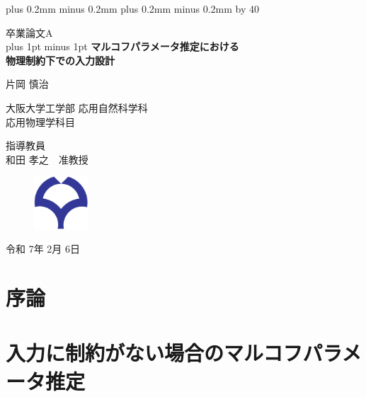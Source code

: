 \documentclass[a4paper,12pt,oneside,openany]{jsbook}
\def\kcharparline#1{%
   \ifx\xkanjiskip\undefined%
   \jintercharskip 0mm plus 0.2mm minus 0.2mm
   \else
   \xkanjiskip 0mm plus 0.2mm minus 0.2mm
   \fi
   \settowidth{\textwidth}{あ}%
   \multiply\textwidth by #1}
\begin{document}
\kcharparline{40} %



\begin{titlepage}
\begin{center}
	{\Large 卒業論文A\\}
	\vspace{ 5mm }
	\baselineskip 35pt plus 1pt minus 1pt
	{\bf {\huge マルコフパラメータ推定における \\物理制約下での入力設計}}
	
	\vspace{ 30mm }
	{\LARGE 片岡 慎治 \\}
	
	\vspace{ 10mm }
	{\large 大阪大学工学部 応用自然科学科\\}
	{\large 応用物理学科目\\}
	
	\vspace{ 10mm }
	{\large 指導教員\\}
	{\large 和田 孝之　准教授 \\}
	
	\vspace{ 5mm }
	\begin{figure}[h]
	\centering
	\includegraphics[width=20mm]{osaka_logo.pdf}\\
	\end{figure}
	\vspace{ 5mm }
	{\large 令和 7年 2月 6日}
\end{center}
\end{titlepage}
\thispagestyle{empty}


\frontmatter

\tableofcontents

\mainmatter
% 
\chapter{序論}



\chapter{入力に制約がない場合のマルコフパラメータ推定}

\end{document}
